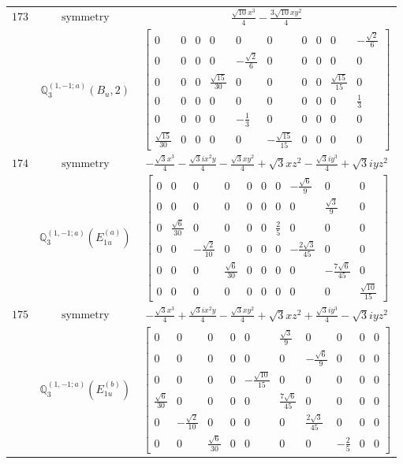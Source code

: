 \documentclass[fleqn,8pt,landscape]{jsarticle}
\begin{document}
\begin{longtable}{ccc}
$ 173 $ & $ \text{symmetry} $ & $ \frac{\sqrt{10} x^{3}}{4} - \frac{3 \sqrt{10} x y^{2}}{4} $ \\
$  $ & $ \mathbb{Q}_{3}^{(1,-1;a)}(B_{u},2) $ & $ \begin{bmatrix} 0 & 0 & 0 & 0 & 0 & 0 & 0 & 0 & 0 & - \frac{\sqrt{2}}{6} \\ 0 & 0 & 0 & 0 & - \frac{\sqrt{2}}{6} & 0 & 0 & 0 & 0 & 0 \\ 0 & 0 & 0 & \frac{\sqrt{15}}{30} & 0 & 0 & 0 & 0 & \frac{\sqrt{15}}{15} & 0 \\ 0 & 0 & 0 & 0 & 0 & 0 & 0 & 0 & 0 & \frac{1}{3} \\ 0 & 0 & 0 & 0 & - \frac{1}{3} & 0 & 0 & 0 & 0 & 0 \\ \frac{\sqrt{15}}{30} & 0 & 0 & 0 & 0 & - \frac{\sqrt{15}}{15} & 0 & 0 & 0 & 0 \end{bmatrix} $ \\ \hline
$ 174 $ & $ \text{symmetry} $ & $ - \frac{\sqrt{3} x^{3}}{4} - \frac{\sqrt{3} i x^{2} y}{4} - \frac{\sqrt{3} x y^{2}}{4} + \sqrt{3} x z^{2} - \frac{\sqrt{3} i y^{3}}{4} + \sqrt{3} i y z^{2} $ \\
$  $ & $ \mathbb{Q}_{3}^{(1,-1;a)}(E_{1u}^{(a)}) $ & $ \begin{bmatrix} 0 & 0 & 0 & 0 & 0 & 0 & 0 & - \frac{\sqrt{6}}{9} & 0 & 0 \\ 0 & 0 & 0 & 0 & 0 & 0 & 0 & 0 & \frac{\sqrt{3}}{9} & 0 \\ 0 & \frac{\sqrt{6}}{30} & 0 & 0 & 0 & 0 & \frac{2}{5} & 0 & 0 & 0 \\ 0 & 0 & - \frac{\sqrt{2}}{10} & 0 & 0 & 0 & 0 & - \frac{2 \sqrt{3}}{45} & 0 & 0 \\ 0 & 0 & 0 & \frac{\sqrt{6}}{30} & 0 & 0 & 0 & 0 & - \frac{7 \sqrt{6}}{45} & 0 \\ 0 & 0 & 0 & 0 & 0 & 0 & 0 & 0 & 0 & \frac{\sqrt{10}}{15} \end{bmatrix} $ \\ \hline
$ 175 $ & $ \text{symmetry} $ & $ - \frac{\sqrt{3} x^{3}}{4} + \frac{\sqrt{3} i x^{2} y}{4} - \frac{\sqrt{3} x y^{2}}{4} + \sqrt{3} x z^{2} + \frac{\sqrt{3} i y^{3}}{4} - \sqrt{3} i y z^{2} $ \\
$  $ & $ \mathbb{Q}_{3}^{(1,-1;a)}(E_{1u}^{(b)}) $ & $ \begin{bmatrix} 0 & 0 & 0 & 0 & 0 & \frac{\sqrt{3}}{9} & 0 & 0 & 0 & 0 \\ 0 & 0 & 0 & 0 & 0 & 0 & - \frac{\sqrt{6}}{9} & 0 & 0 & 0 \\ 0 & 0 & 0 & 0 & - \frac{\sqrt{10}}{15} & 0 & 0 & 0 & 0 & 0 \\ \frac{\sqrt{6}}{30} & 0 & 0 & 0 & 0 & \frac{7 \sqrt{6}}{45} & 0 & 0 & 0 & 0 \\ 0 & - \frac{\sqrt{2}}{10} & 0 & 0 & 0 & 0 & \frac{2 \sqrt{3}}{45} & 0 & 0 & 0 \\ 0 & 0 & \frac{\sqrt{6}}{30} & 0 & 0 & 0 & 0 & - \frac{2}{5} & 0 & 0 \end{bmatrix} $ \\ \hline

\end{longtable}
\end{document}
